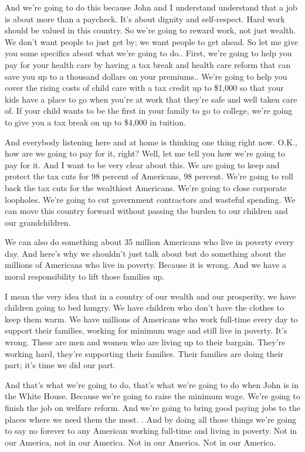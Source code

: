 And we're going to do this because John and I understand understand that
a job is about more than a paycheck. It's about dignity and
self-respect. Hard work should be valued in this country. So we're going
to reward work, not just wealth. We don't want people to just get by; we
want people to get ahead. So let me give you some specifics about what
we're going to do.. First, we're going to help you pay for your health
care by having a tax break and health care reform that can save you up
to a thousand dollars on your premiums.. We're going to help you cover
the rising costs of child care with a tax credit up to \$1,000 so that
your kids have a place to go when you're at work that they're safe and
well taken care of. If your child wants to be the first in your family
to go to college, we're going to give you a tax break on up to \$4,000
in tuition.

And everybody listening here and at home is thinking one thing right
now. O.K., how are we going to pay for it, right? Well, let me tell you
how we're going to pay for it. And I want to be very clear about this.
We are going to keep and protect the tax cuts for 98 percent of
Americans, 98 percent. We're going to roll back the tax cuts for the
wealthiest Americans. We're going to close corporate loopholes. We're
going to cut government contractors and wasteful spending. We can move
this country forward without passing the burden to our children and our
grandchildren.

We can also do something about 35 million Americans who live in poverty
every day. And here's why we shouldn't just talk about but do something
about the millions of Americans who live in poverty. Because it is
wrong. And we have a moral responsibility to lift those families up.

I mean the very idea that in a country of our wealth and our prosperity,
we have children going to bed hungry. We have children who don't have
the clothes to keep them warm. We have millions of Americans who work
full-time every day to support their families, working for minimum wage
and still live in poverty. It's wrong. These are men and women who are
living up to their bargain. They're working hard, they're supporting
their families. Their families are doing their part; it's time we did
our part.

And that's what we're going to do, that's what we're going to do when
John is in the White House. Because we're going to raise the minimum
wage. We're going to finish the job on welfare reform. And we're going
to bring good paying jobs to the places where we need them the most. .
And by doing all those things we're going to say no forever to any
American working full-time and living in poverty. Not in our America,
not in our America. Not in our America. Not in our America.

